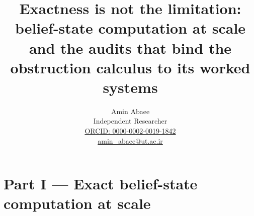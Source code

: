 \documentclass[10pt,twocolumn]{article}
\theoremstyle{plain}
\theoremstyle{definition}
\theoremstyle{remark}
\begin{document}
\title{Exactness is not the limitation: belief-state computation at scale and the audits that bind the obstruction calculus to its worked systems}

\part*{Part I --- Exact belief-state computation at scale}
\label{part:scale}

\author{Amin Abaee\\[0.35em]
{\small Independent Researcher}\\[0.55em]
{\small\href{https://orcid.org/0000-0002-0019-1842}{ORCID: 0000-0002-0019-1842}}\\[0.3em]
{\small\href{mailto:amin\_abaee@ut.ac.ir}{amin\_abaee@ut.ac.ir}}}
\maketitle
\end{document}
